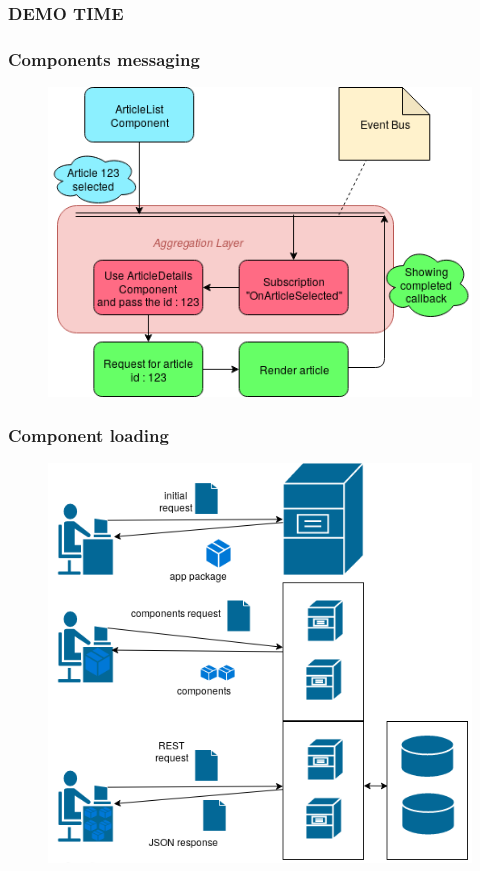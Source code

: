 \begin{frame}
\frametitle{DEMO TIME}
\end{frame}


\begin{frame}
\frametitle{Components messaging}
\begin{figure}
	\centering
	\includegraphics[width=0.7\linewidth]{pictures/EventBus}
	\label{fig:eventbus}
\end{figure}
\end{frame}

\begin{frame}
\frametitle{Component loading}
\begin{figure}
	\centering
	\includegraphics[width=0.7\linewidth]{pictures/communication_sequence}
	\label{fig:communicationsequence}
\end{figure}

\end{frame}


